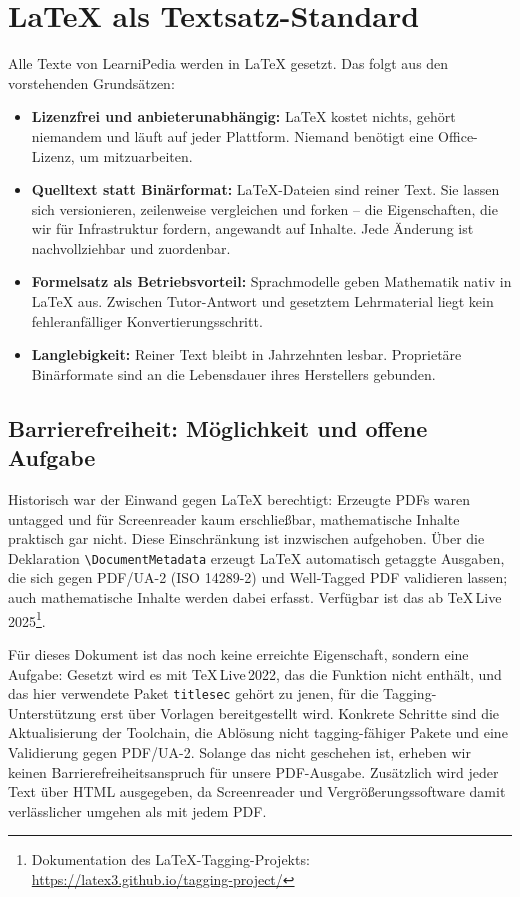 \documentclass[11pt,a4paper]{article}
\begin{document}
\section{LaTeX als Textsatz-Standard}
Alle Texte von LearniPedia werden in LaTeX gesetzt. Das folgt aus den vorstehenden Grundsätzen:
\begin{itemize}[label=--]
    \item \textbf{Lizenzfrei und anbieterunabhängig:} LaTeX kostet nichts, gehört niemandem und läuft auf jeder Plattform. Niemand benötigt eine Office-Lizenz, um mitzuarbeiten.
    \item \textbf{Quelltext statt Binärformat:} LaTeX-Dateien sind reiner Text. Sie lassen sich versionieren, zeilenweise vergleichen und forken -- die Eigenschaften, die wir für Infrastruktur fordern, angewandt auf Inhalte. Jede Änderung ist nachvollziehbar und zuordenbar.
    \item \textbf{Formelsatz als Betriebsvorteil:} Sprachmodelle geben Mathematik nativ in LaTeX aus. Zwischen Tutor-Antwort und gesetztem Lehrmaterial liegt kein fehleranfälliger Konvertierungsschritt.
    \item \textbf{Langlebigkeit:} Reiner Text bleibt in Jahrzehnten lesbar. Proprietäre Binärformate sind an die Lebensdauer ihres Herstellers gebunden.
\end{itemize}

\subsection{Barrierefreiheit: Möglichkeit und offene Aufgabe}
Historisch war der Einwand gegen LaTeX berechtigt: Erzeugte PDFs waren untagged und für Screenreader kaum erschließbar, mathematische Inhalte praktisch gar nicht. Diese Einschränkung ist inzwischen aufgehoben. Über die Deklaration \texttt{\textbackslash DocumentMetadata} erzeugt LaTeX automatisch getaggte Ausgaben, die sich gegen PDF/UA-2 (ISO 14289-2) und Well-Tagged PDF validieren lassen; auch mathematische Inhalte werden dabei erfasst. Verfügbar ist das ab TeX\,Live\,2025\footnote{Dokumentation des LaTeX-Tagging-Projekts: \url{https://latex3.github.io/tagging-project/}}.

Für dieses Dokument ist das noch keine erreichte Eigenschaft, sondern eine Aufgabe: Gesetzt wird es mit TeX\,Live\,2022, das die Funktion nicht enthält, und das hier verwendete Paket \texttt{titlesec} gehört zu jenen, für die Tagging-Unterstützung erst über Vorlagen bereitgestellt wird. Konkrete Schritte sind die Aktualisierung der Toolchain, die Ablösung nicht tagging-fähiger Pakete und eine Validierung gegen PDF/UA-2. Solange das nicht geschehen ist, erheben wir keinen Barrierefreiheitsanspruch für unsere PDF-Ausgabe. Zusätzlich wird jeder Text über HTML ausgegeben, da Screenreader und Vergrößerungssoftware damit verlässlicher umgehen als mit jedem PDF.
\end{document}
